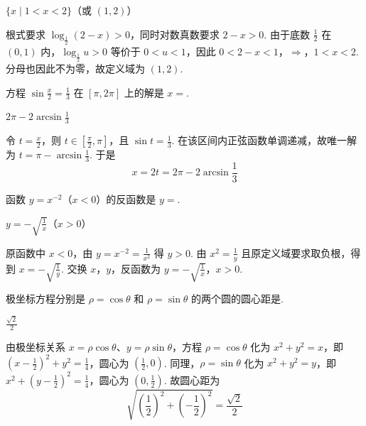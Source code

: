 \documentclass[UTF8,a4paper,oneside,11pt]{ctexbook}
\begin{document}
\begin{answer}
\(\{x\mid 1<x<2\}\)（或 \((1,2)\)）
\end{answer}

\begin{solution}
根式要求 \(\log_{\frac{1}{2}}(2-x)>0\)，同时对数真数要求 \(2-x>0\). 由于底数 \(\frac{1}{2}\) 在 \((0,1)\) 内，\(\log_{\frac{1}{2}}u>0\) 等价于 \(0<u<1\)，因此
\(0<2-x<1\)，\(\Longrightarrow\)，\(1<x<2\).
分母也因此不为零，故定义域为 \((1,2)\).
\end{solution}

\begin{problem}
方程 \(\sin\frac{x}{2}=\frac{1}{3}\) 在 \(\left[\pi,2\pi\right]\) 上的解是 \(x=\)\fillinblank{}.
\end{problem}

\begin{answer}
\(2\pi - 2\arcsin \frac{1}{3}\)
\end{answer}

\begin{solution}
令 \(t=\frac{x}{2}\)，则 \(t\in\left[\frac{\pi}{2},\pi\right]\)，且 \(\sin t=\frac{1}{3}\). 在该区间内正弦函数单调递减，故唯一解为 \(t=\pi-\arcsin\frac{1}{3}\). 于是
\[
x=2t=2\pi-2\arcsin\frac{1}{3}
\]
\end{solution}

\begin{problem}
函数 \(y=x^{-2}\)（\(x<0\)）的反函数是 \(y=\)\fillinblank{}.
\end{problem}

\begin{answer}
\(y=-\sqrt{\frac{1}{x}}\)（\(x>0\)）
\end{answer}

\begin{solution}
原函数中 \(x<0\)，由 \(y=x^{-2}=\frac{1}{x^2}\) 得 \(y>0\). 由 \(x^2=\frac{1}{y}\) 且原定义域要求取负根，得到 \(x=-\sqrt{\frac{1}{y}}\). 交换 \(x\)，\(y\)，反函数为
\(y=-\sqrt{\frac{1}{x}}\)，\(x>0\).
\end{solution}

\begin{problem}
极坐标方程分别是 \(\rho=\cos\theta\) 和 \(\rho=\sin\theta\) 的两个圆的圆心距是\fillinblank{}.
\end{problem}

\begin{answer}
\(\frac{\sqrt{2}}{2}\)
\end{answer}

\begin{solution}
由极坐标关系 \(x=\rho\cos\theta\)、\(y=\rho\sin\theta\)，方程 \(\rho=\cos\theta\) 化为 \(x^2+y^2=x\)，即 \(\left(x-\frac{1}{2}\right)^2+y^2=\frac{1}{4}\)，圆心为 \(\left(\frac{1}{2},0\right)\). 同理，\(\rho=\sin\theta\) 化为 \(x^2+y^2=y\)，即 \(x^2+\left(y-\frac{1}{2}\right)^2=\frac{1}{4}\)，圆心为 \(\left(0,\frac{1}{2}\right)\). 故圆心距为
\[
\sqrt{\left(\frac{1}{2}\right)^2+\left(-\frac{1}{2}\right)^2}=\frac{\sqrt{2}}{2}
\]
\end{solution}
\end{document}
